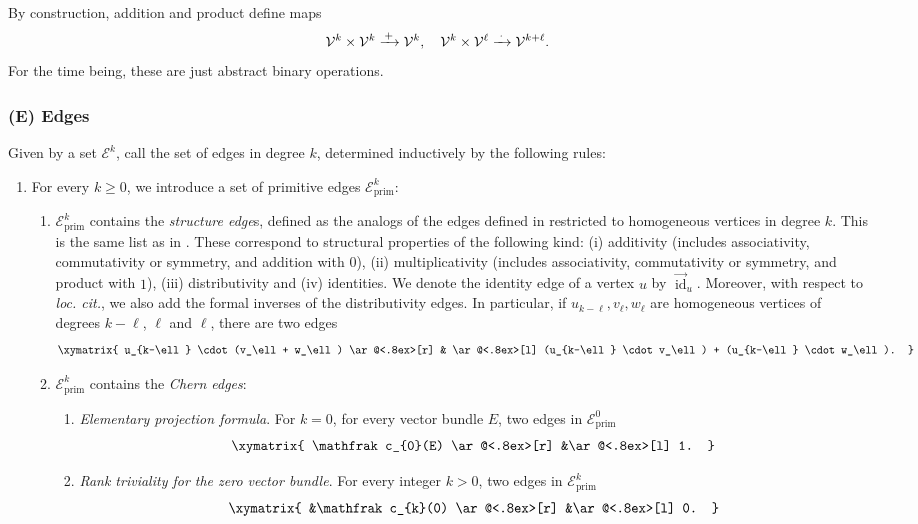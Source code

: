\documentclass[11pt]{article}
\providecommand{\loccit}{\emph{loc. cit.}}
\newcommand\To[1]{\mathchoice{\xrightarrow{\kern1pt#1\kern1pt}}{\stackrel{#1}{\longrightarrow}}{}{}}
\theoremstyle{plain}
\theoremstyle{definition}
\newcommand{\Ecal}{\mathcal E}
\newcommand{\Vcal}{\mathcal V}
\newcommand{\cfrak}{\mathfrak c}
\newcommand{\prim}{\mathrm{prim}}
\DeclareMathOperator{\id}{id}
\begin{document}
By construction, addition and product define maps
\begin{equation}\label{eq:operations-vertices}
\Vcal^{k}\times\Vcal^{k}\To{+}\Vcal^{k},\quad \Vcal^{k}\times\Vcal^{\ell}\To{\,\cdot\,}\Vcal^{k+\ell}.
\end{equation}
For the time being, these are just abstract binary operations.

\subsubsection*{\textup{(E)} Edges}
Given by a set $\Ecal^k$, call the set of edges in degree $k$, determined inductively by the following rules:
\begin{enumerate}
\item For every $k\geq 0$, we introduce a set of primitive edges $\Ecal^k_\prim$:
\begin{enumerate}
\item \label{eq:structureedges} $\Ecal^k_\prim$ contains the \emph{structure edge}s, defined as the analogs of the edges defined in \cite[Volume I, Definition 3.1.6]{Johnson-Yau} restricted to homogeneous vertices in degree $k$. This is the same list as in \cite[]{Laplaza}. These correspond to structural properties of the following kind: (i) additivity (includes associativity, commutativity or symmetry, and addition with $0$), (ii) multiplicativity (includes associativity, commutativity or symmetry, and product with $1$), (iii) distributivity and (iv) identities. We denote the identity edge of a vertex $u$ by $\overset{\to}{\id}_u$. Moreover, with respect to \loccit, we also add the formal inverses of the distributivity edges. In particular, if $u_{k-\ell}, v_{\ell}, w_{\ell}$ are homogeneous vertices of degrees $k-\ell$, $\ell$ and $\ell$, there are two edges
\begin{displaymath}
\xymatrix{
u_{k-\ell} \cdot (v_\ell + w_\ell) \ar@<.8ex>[r] & \ar@<.8ex>[l] (u_{k-\ell} \cdot v_\ell) + (u_{k-\ell} \cdot w_\ell).
}
\end{displaymath}
\item $\Ecal^k_\prim$ contains the \emph{Chern edges}:
\begin{enumerate}
\item\label{item:formal-iso-1} \emph{Elementary projection formula}. For $k=0$, for every vector bundle $E$, two edges in $\Ecal_{\prim}^0$
\begin{displaymath}
\xymatrix{
\cfrak_{0}(E) \ar@<.8ex>[r] &\ar@<.8ex>[l] 1.
}
\end{displaymath}
\item\label{item:formal-iso-3} \emph{Rank triviality for the zero vector bundle}. For every integer $k > 0$, two edges in $\Ecal^k_{\prim}$
\begin{displaymath}
\xymatrix{
&\cfrak_{k}(0) \ar@<.8ex>[r] &\ar@<.8ex>[l] 0.
}
\end{displaymath}


\end{enumerate}
\end{enumerate}
\end{enumerate}
\end{document}
